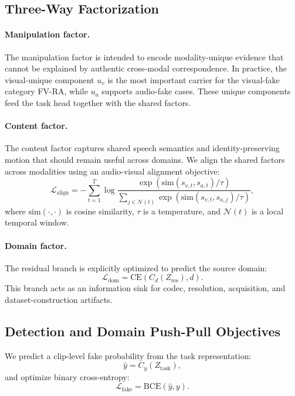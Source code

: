 \documentclass{article}
\begin{document}
\subsection{Three-Way Factorization}

\paragraph{Manipulation factor.}
The manipulation factor is intended to encode modality-unique evidence that cannot be explained by authentic cross-modal correspondence. In practice, the visual-unique component $u_v$ is the most important carrier for the visual-fake category FV-RA, while $u_a$ supports audio-fake cases. These unique components feed the task head together with the shared factors.

\paragraph{Content factor.}
The content factor captures shared speech semantics and identity-preserving motion that should remain useful across domains. We align the shared factors across modalities using an audio-visual alignment objective:
\begin{equation}
\mathcal{L}_{\mathrm{align}} = - \sum_{t=1}^T
\log
\frac{\exp(\mathrm{sim}(s_{v,t}, s_{a,t})/\tau)}
{\sum_{j \in \mathcal{N}(t)} \exp(\mathrm{sim}(s_{v,t}, s_{a,j})/\tau)},
\end{equation}
where $\mathrm{sim}(\cdot,\cdot)$ is cosine similarity, $\tau$ is a temperature, and $\mathcal{N}(t)$ is a local temporal window.

\paragraph{Domain factor.}
The residual branch is explicitly optimized to predict the source domain:
\begin{equation}
\mathcal{L}_{\mathrm{dom}} = \mathrm{CE}(C_d(Z_{\mathrm{res}}), d).
\end{equation}
This branch acts as an information sink for codec, resolution, acquisition, and dataset-construction artifacts.

\subsection{Detection and Domain Push-Pull Objectives}

We predict a clip-level fake probability from the task representation:
\begin{equation}
\hat{y} = C_y(Z_{\mathrm{task}}),
\end{equation}
and optimize binary cross-entropy:
\begin{equation}
\mathcal{L}_{\mathrm{fake}} = \mathrm{BCE}(\hat{y}, y).
\end{equation}
\end{document}
